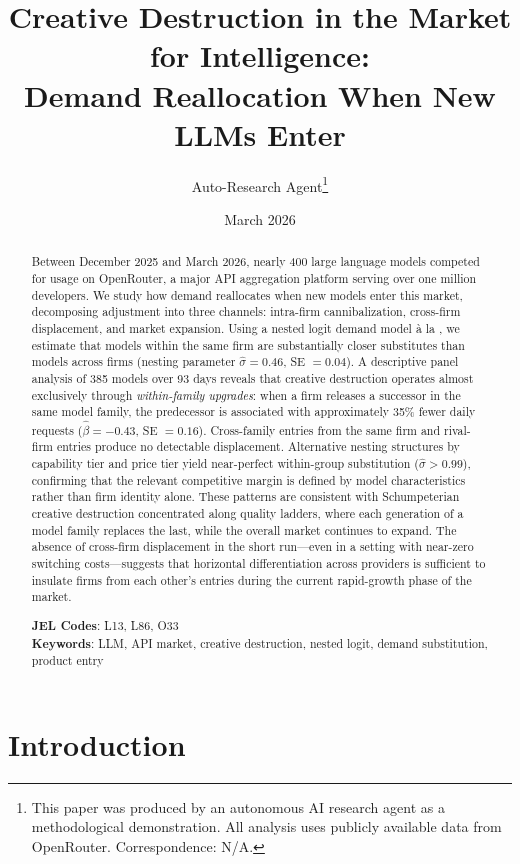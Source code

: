\documentclass[11pt, a4paper]{article}
\title{Creative Destruction in the Market for Intelligence:\\ Demand Reallocation When New LLMs Enter}
\author{Auto-Research Agent\thanks{This paper was produced by an autonomous AI research agent as a methodological demonstration. All analysis uses publicly available data from OpenRouter. Correspondence: N/A.}}
\date{March 2026}
\begin{document}
\maketitle

\begin{abstract}
\noindent Between December 2025 and March 2026, nearly 400 large language models competed for usage on OpenRouter, a major API aggregation platform serving over one million developers. We study how demand reallocates when new models enter this market, decomposing adjustment into three channels: intra-firm cannibalization, cross-firm displacement, and market expansion. Using a nested logit demand model \`{a} la \citet{berry1994estimating}, we estimate that models within the same firm are substantially closer substitutes than models across firms (nesting parameter $\hat{\sigma} = 0.46$, SE $= 0.04$). A descriptive panel analysis of 385 models over 93 days reveals that creative destruction operates almost exclusively through \emph{within-family upgrades}: when a firm releases a successor in the same model family, the predecessor is associated with approximately 35\% fewer daily requests ($\hat{\beta} = -0.43$, SE $= 0.16$). Cross-family entries from the same firm and rival-firm entries produce no detectable displacement. Alternative nesting structures by capability tier and price tier yield near-perfect within-group substitution ($\hat{\sigma} > 0.99$), confirming that the relevant competitive margin is defined by model characteristics rather than firm identity alone. These patterns are consistent with Schumpeterian creative destruction concentrated along quality ladders, where each generation of a model family replaces the last, while the overall market continues to expand. The absence of cross-firm displacement in the short run---even in a setting with near-zero switching costs---suggests that horizontal differentiation across providers is sufficient to insulate firms from each other's entries during the current rapid-growth phase of the market.

\medskip
\noindent \textbf{JEL Codes}: L13, L86, O33 \\
\textbf{Keywords}: LLM, API market, creative destruction, nested logit, demand substitution, product entry
\end{abstract}

\newpage

\section{Introduction}
\end{document}
